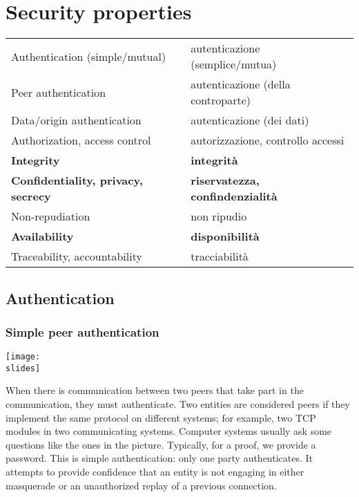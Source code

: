 \section{Security properties}\label{cap:secprop}
\begin{center}
  \begin{tabular}{||l l||}
    \hline
    Authentication (simple/mutual)             & autenticazione (semplice/mutua)         \\
    Peer authentication                        & autenticazione (della controparte)      \\
    Data/origin authentication                 & autenticazione (dei dati)               \\
    Authorization, access control              & autorizzazione, controllo accessi       \\
    \textbf{Integrity}                         & \textbf{integrità}                      \\
    \textbf{Confidentiality, privacy, secrecy} & \textbf{riservatezza, confindenzialità} \\
    Non-repudiation                            & non ripudio                             \\
    \textbf{Availability}                      & \textbf{disponibilità}                  \\
    Traceability, accountability               & tracciabilità                           \\
    \hline
  \end{tabular}
\end{center}


\subsection{Authentication}

\subsubsection*{Simple peer authentication}

\noindent
\begin{minipage}{0.5\textwidth}
  \centering
  \texttt{[image: \\slides]}
\end{minipage}
\hspace{0.05\textwidth}
\begin{minipage}{0.4\textwidth}
  When there is communication between two peers that take part in the communication, they must authenticate. Two entities are considered peers if they implement the same protocol on different systems; for example, two TCP modules in two communicating systems. Computer systems usually ask some questions like the ones in the picture. Typically, for a proof, we provide a password. This is simple authentication: only one party authenticates. It attempts to provide confidence that an entity is not engaging in either masquerade or an unauthorized replay of a previous connection.
\end{minipage}


